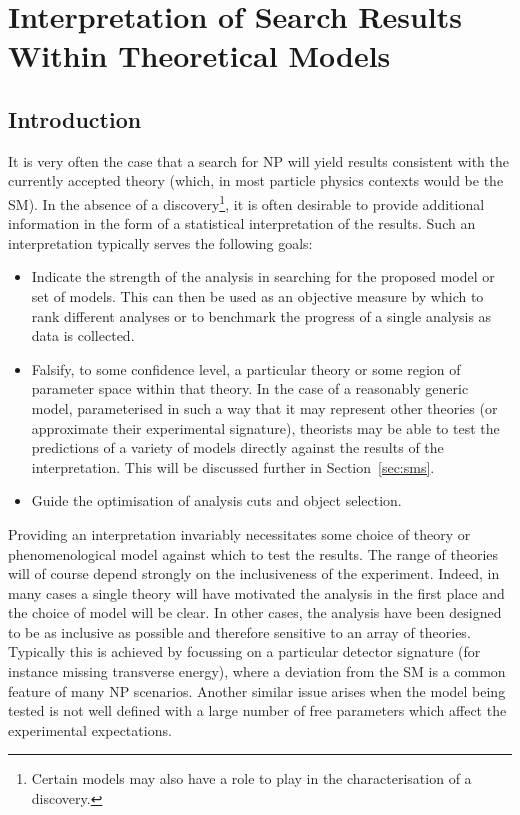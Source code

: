 \chapter{Interpretation of Search Results Within Theoretical Models}
\section{Introduction}
It is very often the case that a search for \ac{NP} will yield results
consistent with the currently accepted theory (which, in most particle physics
contexts would be the \ac{SM}). In the absence of a discovery\footnote{Certain
  models may also have a role to play in the characterisation of a discovery.},
it is often desirable to provide additional information in the form of a
statistical interpretation of the results. Such an interpretation typically
serves the following goals:
\begin{itemize}
\item Indicate the strength of the analysis in searching for the proposed model
  or set of models. This can then be used as an objective measure by which to
  rank different analyses or to benchmark the progress of a single analysis as
  data is collected.
\item Falsify, to some confidence level, a particular theory or some region of
  parameter space within that theory. In the case of a reasonably generic model,
  parameterised in such a way that it may represent other theories (or
  approximate their experimental signature), theorists may be able to
  test the predictions of a variety of models directly against the results of
  the interpretation. This will be discussed further in Section~\ref{sec:sms}.
\item Guide the optimisation of analysis cuts and object selection.
\end{itemize}

Providing an interpretation invariably necessitates some choice of theory or
phenomenological model against which to test the results. The range of theories
will of course depend strongly on the inclusiveness of the experiment. Indeed,
in many cases a single theory will have motivated the analysis in the first
place and the choice of model will be clear. In other cases, the analysis have
been designed to be as inclusive as possible and therefore sensitive to an array
of theories. Typically this is achieved by focussing on a particular detector
signature (for instance missing transverse energy), where a deviation from the
\ac{SM} is a common feature of many \ac{NP} scenarios. Another similar issue
arises when the model being tested is not well defined with a large number of
free parameters which affect the experimental expectations.

